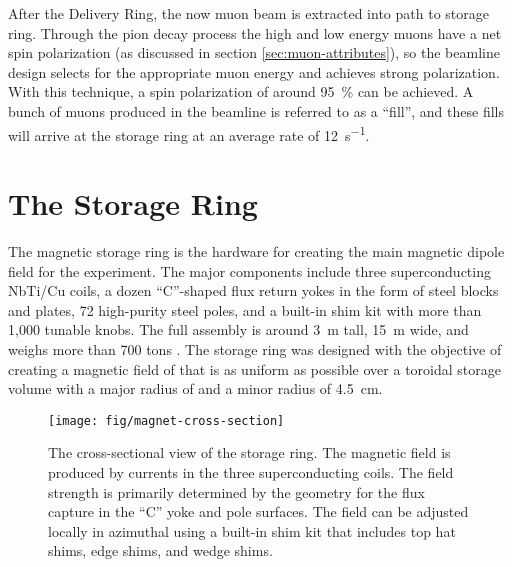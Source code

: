 After the Delivery Ring, the now muon beam is extracted into path to \mugmtwo storage ring. Through the pion decay process the high and low energy muons have a net spin polarization (as discussed in section \ref{sec:muon-attributes}), so the beamline design selects for the appropriate muon energy and achieves strong polarization. With this technique, a spin polarization of around \SI{95}{\percent} can be achieved.  A bunch of muons produced in the beamline is referred to as a ``fill'', and these fills will arrive at the storage ring at an average rate of \SI{12}{\second^{-1}}\cite{e989-tdr}.

\section{The Storage Ring} \label{sec:storage-ring}
The magnetic storage ring is the hardware for creating the main magnetic dipole field for the experiment.  The major components include three superconducting NbTi/Cu coils, a dozen ``C''-shaped flux return yokes in the form of steel blocks and plates, 72 high-purity steel poles, and a built-in shim kit with more than 1,000 tunable knobs.  The full assembly is around \SI{3}{\meter} tall, \SI{15}{\meter} wide, and weighs more than 700 tons \cite{e989-tdr}.  The storage ring was designed with the objective of creating a magnetic field of \bmagic that is as uniform as possible over a toroidal storage volume with a major radius of \rmagic and a minor radius of \SI{4.5}{\cm}.

\begin{figure}
\label{fig:magnet-cross-section}
\centering
\texttt{[image: fig/magnet-cross-section]}
\caption{The cross-sectional view of the storage ring.  The magnetic field is produced by currents in the three superconducting coils.  The field strength is primarily determined by the geometry for the flux capture in the ``C'' yoke and pole surfaces.  The field can be adjusted locally in azimuthal using a built-in shim kit that includes top hat shims, edge shims, and wedge shims.}
\end{figure}

